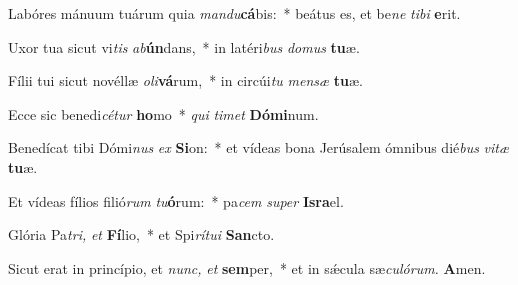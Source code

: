 \item Labóres mánuum tuárum quia \textit{mandu}\textbf{cá}bis:~* beátus es, et be\textit{ne} \textit{tibi} \textbf{e}rit.
\item Uxor tua sicut vi\textit{tis} \textit{ab}\textbf{ún}dans,~* in latéri\textit{bus} \textit{domus} \textbf{tu}æ.
\item Fílii tui sicut novéllæ \textit{oli}\textbf{vá}rum,~* in circúi\tinyhspace\textit{tu} \textit{mensæ} \textbf{tu}æ.
\item Ecce sic benedi\tinyhspace\textit{cétur} \textbf{ho}mo~* \textit{qui} \textit{timet} \textbf{Dómi}num.
\item Benedícat tibi Dómi\textit{nus} \textit{ex} \textbf{Si}on:~* et vídeas bona Jerúsalem ómnibus dié\textit{bus} \textit{vitæ} \textbf{tu}æ.
\item Et vídeas fílios filió\textit{rum} \textit{tu}\textbf{ó}rum:~* pa\tinyhspace\textit{cem} \textit{super} \textbf{Isra}el.
\item Glória Pa\tinyhspace\textit{tri,} \textit{et} \textbf{Fí}lio,~* et Spi\textit{rítui} \textbf{San}cto.
\item Sicut erat in princípio, et \textit{nunc,} \textit{et} \textbf{sem}per,~* et in sǽcula sæ\textit{culórum.} \textbf{A}men.
